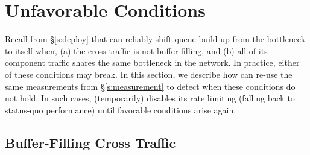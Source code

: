 \section{Unfavorable Conditions}\label{s:queue-ctl}

Recall from \S\ref{s:deploy} that \name can reliably shift queue build up from the bottleneck to itself when, (a) the cross-traffic is not buffer-filling, and (b) all of its component traffic shares the same bottleneck in the network.
In practice, either of these conditions may break. 
In this section, we describe how \name can re-use the same measurements from \S\ref{s:measurement} to detect when these conditions do not hold. In such cases, \name (temporarily) disables its rate limiting (falling back to status-quo performance) until favorable conditions arise again. 

\subsection{Buffer-Filling Cross Traffic}
\label{s:buffer-filling}


